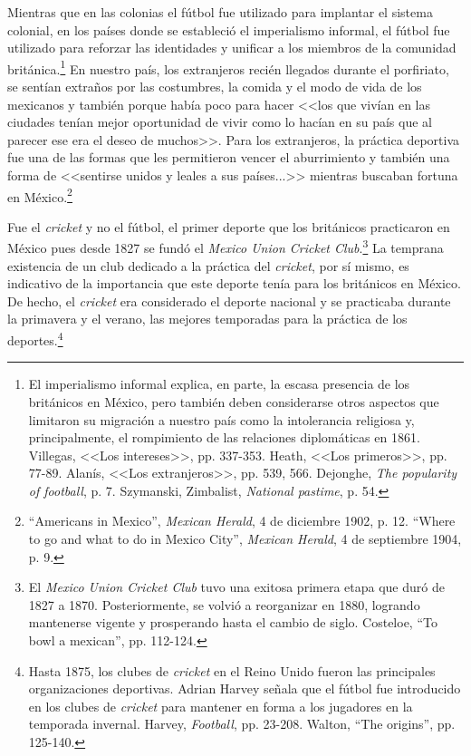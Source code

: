\documentclass[11pt,a5paper,twoside]{book} %
\begin{document}
Mientras que en las colonias el fútbol fue utilizado para implantar el sistema colonial, en los países donde se estableció el imperialismo informal, el fútbol fue utilizado para reforzar las identidades y unificar a los miembros de la comunidad británica.\footnote{El imperialismo informal explica, en parte, la escasa presencia de los británicos en México, pero también deben considerarse otros aspectos que limitaron su migración a nuestro país como la intolerancia religiosa y, principalmente, el rompimiento de las relaciones diplomáticas en 1861. Villegas, <<Los intereses>>, pp. 337-353. Heath, <<Los primeros>>, pp. 77-89. Alanís, <<Los extranjeros>>, pp. 539, 566. Dejonghe, \emph{The popularity of football}, p. 7. Szymanski, Zimbalist, \emph{National pastime}, p. 54.} En nuestro país, los extranjeros recién llegados durante el porfiriato, se sentían extraños por las costumbres, la comida y el modo de vida de los mexicanos y también porque había poco para hacer <<los que vivían en las ciudades  tenían mejor oportunidad de vivir como lo hacían en su país que al parecer ese era el deseo de muchos>>. Para los extranjeros, la práctica deportiva fue una de las formas que les permitieron vencer el aburrimiento y también una forma de <<sentirse unidos y leales a sus países...>> mientras buscaban fortuna en México.\footnote{``Americans in Mexico'', \emph{Mexican Herald}, 4 de diciembre 1902, p. 12. ``Where to go and what to do in Mexico City'', \emph{Mexican Herald}, 4 de septiembre 1904, p. 9.}

Fue el \emph{cricket} y no el fútbol, el primer deporte que los británicos practicaron en
México pues desde 1827 se fundó el \emph{Mexico Union Cricket Club}.\footnote{El \emph{Mexico Union Cricket Club} tuvo una exitosa primera etapa que duró de 1827 a 1870. Posteriormente, se volvió a reorganizar en 1880, logrando mantenerse vigente y prosperando hasta el cambio de siglo. Costeloe, ``To bowl a mexican'', pp. 112-124.} La temprana existencia
de un club dedicado a la práctica del \emph{cricket}, por sí mismo, es indicativo de la importancia
que este deporte tenía para los británicos en México. De hecho, el \emph{cricket} era considerado el
deporte nacional y se practicaba durante la primavera y el verano, las mejores temporadas
para la práctica de los deportes.\footnote{Hasta 1875, los clubes de \emph{cricket} en el Reino Unido fueron las principales organizaciones deportivas. Adrian Harvey señala que el fútbol fue introducido en los clubes de \emph{cricket} para mantener en forma a los jugadores en la temporada invernal. Harvey, \emph{Football}, pp. 23-208. Walton, ``The origins'', pp. 125-140.}
\end{document}
